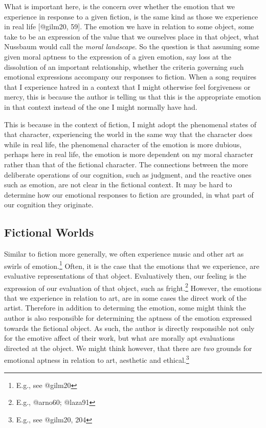 \documentclass[
  letterpaper,
  DIV=11,
  numbers=noendperiod]{scrartcl}
\theoremstyle{remark}
\begin{document}
What is important here, is the concern over whether the emotion that we
experience in response to a given fiction, is the same kind as those we
experience in real life {[}@gilm20, 59{]}. The emotion we have in
relation to some object, some take to be an expression of the value that
we ourselves place in that object, what Nussbaum would call the
\emph{moral landscape}. So the question is that assuming some given
moral aptness to the expression of a given emotion, say loss at the
dissolution of an important relationship, whether the criteria governing
such emotional expressions accompany our responses to fiction. When a
song requires that I experience hatred in a context that I might
otherwise feel forgiveness or mercy, this is because the author is
telling us that this is the appropriate emotion in that context instead
of the one I might normally have had.

This is because in the context of fiction, I might adopt the phenomenal
states of that character, experiencing the world in the same way that
the character does while in real life, the phenomenal character of the
emotion is more dubious, perhaps here in real life, the emotion is more
dependent on my moral character rather than that of the fictional
character. The connections between the more deliberate operations of our
cognition, such as judgment, and the reactive ones such as emotion, are
not clear in the fictional context. It may be hard to determine how our
emotional responses to fiction are grounded, in what part of our
cognition they originate.

\subsection{Fictional Worlds}\label{fictional-worlds}

Similar to fiction more generally, we often experience music and other
art as swirls of emotion.\footnote{E.g., see @gilm20} Often, it is the
case that the emotions that we experience, are evaluative
representations of that object. Evaluatively then, our feeling is the
expression of our evaluation of that object, such as fright.\footnote{E.g.,
  @arno60; @laza91} However, the emotions that we experience in relation
to art, are in some cases the direct work of the artist. Therefore in
addition to determing the emotion, some might think the author is also
responsible for determining the aptness of the emotion expressed towards
the fictional object. As such, the author is directly responsible not
only for the emotive affect of their work, but what are morally apt
evaluations directed at the object. We might think however, that there
are \emph{two} grounds for emotional aptness in relation to art,
aesthetic and ethical.\footnote{E.g., see @gilm20, 204}
\end{document}
